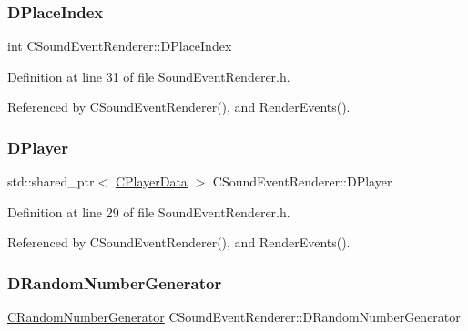 \subsubsection{\texorpdfstring{D\+Place\+Index}{DPlaceIndex}}
{\footnotesize\ttfamily int C\+Sound\+Event\+Renderer\+::\+D\+Place\+Index\hspace{0.3cm}{\ttfamily [protected]}}



Definition at line 31 of file Sound\+Event\+Renderer.\+h.



Referenced by C\+Sound\+Event\+Renderer(), and Render\+Events().

\hypertarget{classCSoundEventRenderer_ad98889d7f52477a2e148d7e390641d51}{}\label{classCSoundEventRenderer_ad98889d7f52477a2e148d7e390641d51} 
\subsubsection{\texorpdfstring{D\+Player}{DPlayer}}
{\footnotesize\ttfamily std\+::shared\+\_\+ptr$<$ \hyperlink{classCPlayerData}{C\+Player\+Data} $>$ C\+Sound\+Event\+Renderer\+::\+D\+Player\hspace{0.3cm}{\ttfamily [protected]}}



Definition at line 29 of file Sound\+Event\+Renderer.\+h.



Referenced by C\+Sound\+Event\+Renderer(), and Render\+Events().

\hypertarget{classCSoundEventRenderer_a591b9430a0f6a70259f87a2467de908f}{}\label{classCSoundEventRenderer_a591b9430a0f6a70259f87a2467de908f} 
\subsubsection{\texorpdfstring{D\+Random\+Number\+Generator}{DRandomNumberGenerator}}
{\footnotesize\ttfamily \hyperlink{classCRandomNumberGenerator}{C\+Random\+Number\+Generator} C\+Sound\+Event\+Renderer\+::\+D\+Random\+Number\+Generator\hspace{0.3cm}{\ttfamily [protected]}}



